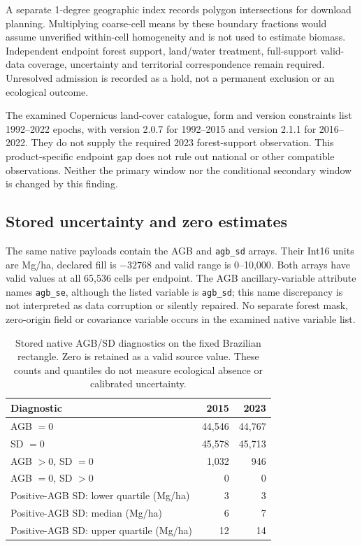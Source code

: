 \documentclass[11pt,a4paper]{article}
\begin{document}
A separate 1-degree geographic index records polygon intersections for download planning. Multiplying coarse-cell means by these boundary fractions would assume unverified within-cell homogeneity and is not used to estimate biomass. Independent endpoint forest support, land/water treatment, full-support valid-data coverage, uncertainty and territorial correspondence remain required. Unresolved admission is recorded as a hold, not a permanent exclusion or an ecological outcome.

The examined Copernicus land-cover catalogue, form and version constraints list 1992--2022 epochs, with version 2.0.7 for 1992--2015 and version 2.1.1 for 2016--2022. They do not supply the required 2023 forest-support observation. This product-specific endpoint gap does not rule out national or other compatible observations. Neither the primary window nor the conditional secondary window is changed by this finding.

\subsection{Stored uncertainty and zero estimates}

The same native payloads contain the AGB and \texttt{agb\_sd} arrays. Their Int16 units are Mg/ha, declared fill is $-32768$ and valid range is 0--10,000. Both arrays have valid values at all 65,536 cells per endpoint. The AGB ancillary-variable attribute names \texttt{agb\_se}, although the listed variable is \texttt{agb\_sd}; this name discrepancy is not interpreted as data corruption or silently repaired. No separate forest mask, zero-origin field or covariance variable occurs in the examined native variable list.

\begin{table}[htbp]
\centering\small
\caption{Stored native AGB/SD diagnostics on the fixed Brazilian rectangle. Zero is retained as a valid source value. These counts and quantiles do not measure ecological absence or calibrated uncertainty.}\label{tab:native_sd}
\begin{tabular}{lrr}
\toprule
Diagnostic & 2015 & 2023\\\midrule
AGB $=0$ & 44,546 & 44,767\\
SD $=0$ & 45,578 & 45,713\\
AGB $>0$, SD $=0$ & 1,032 & 946\\
AGB $=0$, SD $>0$ & 0 & 0\\
Positive-AGB SD: lower quartile (Mg/ha) & 3 & 3\\
Positive-AGB SD: median (Mg/ha) & 6 & 7\\
Positive-AGB SD: upper quartile (Mg/ha) & 12 & 14\\\bottomrule
\end{tabular}
\end{table}
\end{document}
